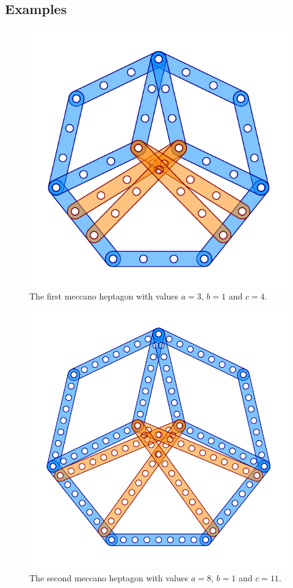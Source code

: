 \documentclass[11pt]{article}
\begin{document}
\subsection{Examples}

\begin{figure}[htp]
\centering
\includegraphics[scale=1]{figs/heptagon-3}
\caption{The first meccano heptagon with values $a=3$, $b=1$ and $c=4$.}
\label{heptagon-3}
\end{figure}

\begin{figure}[htp]
\centering
\includegraphics[scale=1]{figs/heptagon-8}
\caption{The second meccano heptagon with values $a=8$, $b=1$ and $c=11$.}
\label{heptagon-8}
\end{figure}
\end{document}
